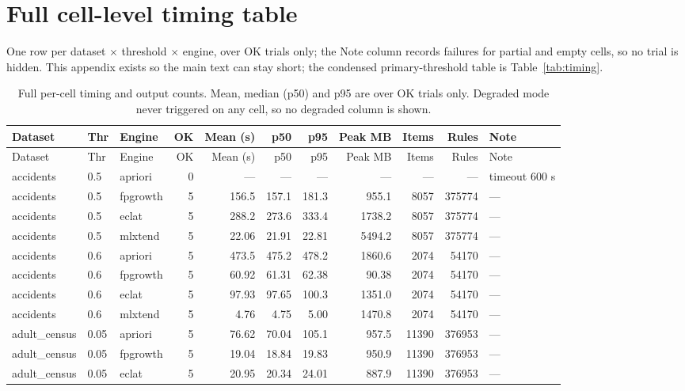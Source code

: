 \documentclass[journal,a4paper]{IEEEtran}
\begin{document}
\onecolumn
\section{Full cell-level timing table}
\label{app:timing}
One row per dataset $\times$ threshold $\times$ engine, over OK trials
only; the Note column records failures for partial and empty cells, so
no trial is hidden. This appendix exists so the main text can stay
short; the condensed primary-threshold table is Table~\ref{tab:timing}.
\renewcommand{\arraystretch}{0.85}
\scriptsize
\setlength{\tabcolsep}{2pt}
\begin{longtable}{p{3.0cm}llrrrrrrrp{2.4cm}}
\caption{Full per-cell timing and output counts. Mean, median (p50) and p95 are over OK trials only. Degraded mode never triggered on any cell, so no degraded column is shown.}
\label{tab:timingfull}\\
\toprule
Dataset & Thr & Engine & OK & Mean (s) & p50 & p95 & Peak MB & Items & Rules & Note \\
\midrule
\endfirsthead
\toprule
Dataset & Thr & Engine & OK & Mean (s) & p50 & p95 & Peak MB & Items & Rules & Note \\
\midrule
\endhead
accidents & 0.5 & apriori & 0 & --- & --- & --- & --- & --- & --- & timeout 600 s \\
accidents & 0.5 & fpgrowth & 5 & 156.5 & 157.1 & 181.3 & 955.1 & 8057 & 375774 & --- \\
accidents & 0.5 & eclat & 5 & 288.2 & 273.6 & 333.4 & 1738.2 & 8057 & 375774 & --- \\
accidents & 0.5 & mlxtend & 5 & 22.06 & 21.91 & 22.81 & 5494.2 & 8057 & 375774 & --- \\
accidents & 0.6 & apriori & 5 & 473.5 & 475.2 & 478.2 & 1860.6 & 2074 & 54170 & --- \\
accidents & 0.6 & fpgrowth & 5 & 60.92 & 61.31 & 62.38 & 90.38 & 2074 & 54170 & --- \\
accidents & 0.6 & eclat & 5 & 97.93 & 97.65 & 100.3 & 1351.0 & 2074 & 54170 & --- \\
accidents & 0.6 & mlxtend & 5 & 4.76 & 4.75 & 5.00 & 1470.8 & 2074 & 54170 & --- \\
adult\_\allowbreak{}census & 0.05 & apriori & 5 & 76.62 & 70.04 & 105.1 & 957.5 & 11390 & 376953 & --- \\
adult\_\allowbreak{}census & 0.05 & fpgrowth & 5 & 19.04 & 18.84 & 19.83 & 950.9 & 11390 & 376953 & --- \\
adult\_\allowbreak{}census & 0.05 & eclat & 5 & 20.95 & 20.34 & 24.01 & 887.9 & 11390 & 376953 & --- \\

\end{longtable}
\end{document}
